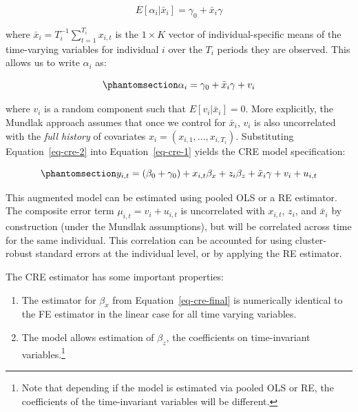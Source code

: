 \documentclass[bib]{statapress}
\begin{document}
\[E[\alpha_i | \bar x_{i}] = \gamma_0 + \bar x_{i}\gamma\]

where \(\bar x_{i} = T_i^{-1} \sum_{t=1}^{T_i} x_{i,t}\) is the
\(1 \times K\) vector of individual-specific means of the time-varying
variables for individual \(i\) over the \(T_i\) periods they are
observed. This allows us to write \(\alpha_i\) as:

\begin{equation}\phantomsection\label{eq-cre-2}{\alpha_i = \gamma_0 + \bar x_{i}\gamma + v_i
}\end{equation}

where \(v_i\) is a random component such that
\(E[v_i | \bar x_{i}] = 0\). More explicitly, the Mundlak approach
assumes that once we control for \(\bar x_{i}\), \(v_i\) is also
uncorrelated with the \emph{full history} of covariates
\(x_{i} = (x_{i,1}, ..., x_{i,T_i})\). Substituting
Equation~\ref{eq-cre-2} into Equation~\ref{eq-cre-1} yields the CRE
model specification:

\begin{equation}\phantomsection\label{eq-cre-final}{y_{i,t} = (\beta_0 + \gamma_0) + x_{i,t}\beta_x + z_{i}\beta_z + \bar x_{i}\gamma + v_i + u_{i,t}
}\end{equation}

This augmented model can be estimated using pooled OLS or a RE
estimator. The composite error term \(\mu_{i,t} = v_i + u_{i,t}\) is
uncorrelated with \(x_{i,t}\), \(z_i\), and \(\bar x_{i}\) by
construction (under the Mundlak assumptions), but will be correlated
across time for the same individual. This correlation can be accounted
for using cluster-robust standard errors at the individual level, or by
applying the RE estimator.

The CRE estimator has some important properties:

\begin{enumerate}
\def\labelenumi{\arabic{enumi}.}
\item
  The estimator for \(\beta_x\) from Equation~\ref{eq-cre-final} is
  numerically identical to the FE estimator in the linear case \citep[
  chap 10]{mundlak1978pooling, wooldridge2010econometric} for all time
  varying variables.
\item
  The model allows estimation of \(\beta_z\), the coefficients on
  time-invariant variables.\footnote{Note that depending if the model is
    estimated via pooled OLS or RE, the coefficients of the
    time-invariant variables will be different.}
\end{enumerate}
\end{document}
